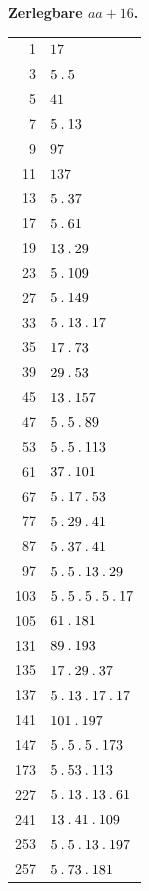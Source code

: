\par{}
\begin{center}\textbf{Zerlegbare $aa+16$.}\end{center}
\begingroup\small\setlength{\tabcolsep}{5pt}
\begin{longtable}{@{}r|l@{}}
1 & $17$\\
3 & $5\mathbin{.} 5$\\
5 & $41$\\
7 & $5\mathbin{.} 13$\\
9 & $97$\\
11 & $137$\\
13 & $5\mathbin{.} 37$\\
17 & $5\mathbin{.} 61$\\
19 & $13\mathbin{.} 29$\\
23 & $5\mathbin{.} 109$\\
27 & $5\mathbin{.} 149$\\
33 & $5\mathbin{.} 13\mathbin{.} 17$\\
35 & $17\mathbin{.} 73$\\
39 & $29\mathbin{.} 53$\\
45 & $13\mathbin{.} 157$\\
47 & $5\mathbin{.} 5\mathbin{.} 89$\\
53 & $5\mathbin{.} 5\mathbin{.} 113$\\
61 & $37\mathbin{.} 101$\\
67 & $5\mathbin{.} 17\mathbin{.} 53$\\
77 & $5\mathbin{.} 29\mathbin{.} 41$\\
87 & $5\mathbin{.} 37\mathbin{.} 41$\\
97 & $5\mathbin{.} 5\mathbin{.} 13\mathbin{.} 29$\\
103 & $5\mathbin{.} 5\mathbin{.} 5\mathbin{.} 5\mathbin{.} 17$\\
105 & $61\mathbin{.} 181$\\
131 & $89\mathbin{.} 193$\\
135 & $17\mathbin{.} 29\mathbin{.} 37$\\
137 & $5\mathbin{.} 13\mathbin{.} 17\mathbin{.} 17$\\
141 & $101\mathbin{.} 197$\\
147 & $5\mathbin{.} 5\mathbin{.} 5\mathbin{.} 173$\\
173 & $5\mathbin{.} 53\mathbin{.} 113$\\
227 & $5\mathbin{.} 13\mathbin{.} 13\mathbin{.} 61$\\
241 & $13\mathbin{.} 41\mathbin{.} 109$\\
253 & $5\mathbin{.} 5\mathbin{.} 13\mathbin{.} 197$\\
257 & $5\mathbin{.} 73\mathbin{.} 181$\\

\end{longtable}
